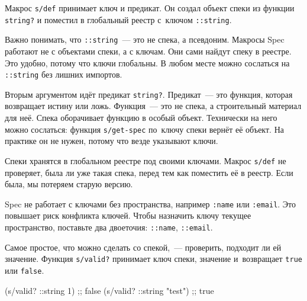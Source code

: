 
Макрос \verb|s/def| принимает ключ и предикат. Он создал объект спеки из
функции \verb|string?| и поместил в глобальный реестр с~ключом
\verb|::string|.

Важно понимать, что \verb|::string|~--- это не спека, а псевдоним. Макросы
Spec работают не с объектами спеки, а с ключам. Они сами найдут спеку в
реестре. Это удобно, потому что ключи глобальны. В любом месте можно сослаться
на \verb|::string| без лишних импортов.


Вторым аргументом идёт предикат \verb|string?|. Предикат~--- это функция,
которая возвращает истину или ложь. Функция~--- это не спека, а строительный
материал для неё. Спека оборачивает функцию в особый объект. Технически на
него можно сослаться: функция \verb|s/get-spec| по~ключу спеки вернёт
её объект. На практике он не нужен, потому что везде указывают ключи.

\begin{english}
\end{english}


Спеки хранятся в глобальном реестре под своими ключами. Макрос \verb|s/def| не
проверяет, была ли уже такая спека, перед тем как поместить её в
реестр. Если была, мы потеряем старую версию.


Spec не работает с ключами без пространства, например \verb|:name| или
\verb|:email|. Это повышает риск конфликта ключей. Чтобы назначить ключу
текущее пространство, поставьте два двоеточия: \verb|::name|, \verb|::email|.


Самое простое, что можно сделать со спекой,~--- проверить, подходит ли ей
значение. Функция \verb|s/valid?| принимает ключ спеки, значение и~возвращает
\verb|true| или \verb|false|.

\begin{english}
  \begin{clojure}
(s/valid? ::string 1)      ;; false
(s/valid? ::string "test") ;; true
  \end{clojure}
\end{english}

